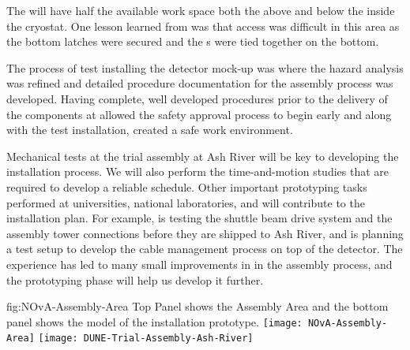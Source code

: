 The   will have half the available work space  both the above and below the  inside the cryostat.  
One lesson learned from  was that access was difficult in this area as the bottom latches were secured and the s were tied together on the bottom.  

The process of test installing the detector mock-up was where the hazard analysis was refined and detailed procedure documentation for the assembly process was developed. 
Having complete, well developed procedures prior to the delivery of the components at  allowed the safety approval process to begin early and %
along with the test installation, created a safe work environment.

Mechanical tests at the  trial assembly at Ash River will be key to developing the installation process. We will also perform the time-and-motion studies that are required to develop a reliable schedule.  Other important prototyping tasks performed at  universities, national laboratories, and  %
will contribute to the installation plan. 
For example,  is testing the  shuttle beam drive system and the  assembly tower connections before they are shipped to Ash River, and 
 is planning a test setup to develop the cable management process on top of the detector. 
The  experience has led to many small improvements in %
in the assembly process, %
and the  prototyping phase will help us develop it further. 


\begin{dunefigure}
{fig:NOvA-Assembly-Area}
{Top Panel shows the  Assembly Area and the bottom panel shows the \threed model of the installation prototype.}                
\texttt{[image: NOvA-Assembly-Area]}
\vspace{-12pt}
\texttt{[image: DUNE-Trial-Assembly-Ash-River]}
\end{dunefigure}

